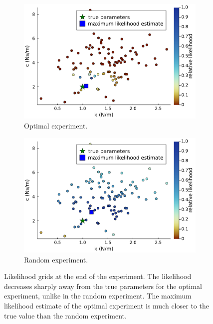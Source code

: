 \begin{figure}[H]
	
	\begin{subfigure}[b]{0.45\textwidth}
		\includegraphics[width=1.0\textwidth]{figure/paper 3/likelihood profile optimal experiment}
		\caption{Optimal experiment.}
		\label{figLikelihoodOpt}
	\end{subfigure}
	\begin{subfigure}[b]{0.45\textwidth}
		\centering
		\includegraphics[width=1.0\textwidth]{figure/paper 3/likelihood profile random experiment}
		\caption{Random experiment.}
		\label{figLikelihoodRand}
	\end{subfigure}
	\caption{Likelihood grids at the end of the experiment. The likelihood decreases sharply away from the true parameters for the optimal experiment, unlike in the random experiment. The maximum likelihood estimate of the optimal experiment is much closer to the true value than the random experiment.} 
	\label{figLikelihood}
\end{figure}
